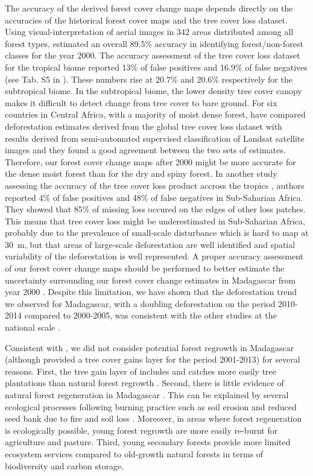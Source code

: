 \documentclass[a4paper, 12pt, leqno]{article}\usepackage[]{graphicx}\usepackage[]{color}
\begin{document}
The accuracy of the derived forest cover change maps depends directly
on the accuracies of the historical forest cover maps and the tree
cover loss dataset. Using visual-interpretation of aerial images in
342 areas distributed among all forest types, \citet{Harper2007}
estimated an overall 89.5\% accuracy in identifying forest/non-forest
classes for the year 2000. The accuracy assessment of the tree cover
loss dataset for the tropical biome reported 13\% of false positives
and 16.9\% of false negatives (see Tab. S5 in
\citet{Hansen2013}). These numbers rise at 20.7\% and 20.6\%
respectively for the subtropical biome. In the subtropical biome, the
lower density tree cover canopy makes it difficult to detect change
from tree cover to bare ground. For six countries in Central Africa,
with a majority of moist dense forest, \citet{Verhegghen2016} have
compared deforestation estimates derived from the global tree cover
loss dataset \citep{Hansen2013} with results derived from
semi-automated supervised classification of Landsat satellite images
\citep{Achard2014} and they found a good agreement between the two
sets of estimates. Therefore, our forest cover change maps after 2000
might be more accurate for the dense moist forest than for the dry and
spiny forest. In another study assessing the accuracy of the tree
cover loss product accross the tropics \citep{Tyukavina2015}, authors
reported 4\% of false positives and 48\% of false negatives in
Sub-Saharian Africa. They showed that 85\% of missing loss occured on
the edges of other loss patches. This means that tree cover loss might
be underestimated in Sub-Saharian Africa, probably due to the
prevalence of small-scale disturbance which is hard to map at 30~m,
but that areas of large-scale deforestation are well identified and
spatial variability of the deforestation is well represented. A proper
accuracy assessment of our forest cover change maps should be
performed to better estimate the uncertainty surrounding our
forest cover change estimates in Madagascar from year 2000
\citep{Olofsson2013,Olofsson2014}. Despite this limitation, we have
shown that the deforestation trend we observed for Madagascar, with a
doubling deforestation on the period 2010-2014 compared to 2000-2005,
was consistent with the other studies at the national scale
\citep{ONE2015, MEFT2009}.

Consistent with \citet{Harper2007}, we did not consider potential
forest regrowth in Madagascar (although \citet{Hansen2013} provided a
tree cover gains layer for the period 2001-2013) for several
reasons. First, the tree gain layer of \citet{Hansen2013} includes and
catches more easily tree plantations than natural forest regrowth
\citep{Tropek2014}. Second, there is little evidence of natural forest
regeneration in Madagascar \citep{Grouzis2001, Harper2007}. This can
be explained by several ecological processes following burning
practice such as soil erosion \citep{Grinand2017} and reduced seed
bank due to fire and soil loss \citep{Grouzis2001}. Moreover, in areas
where forest regeneration is ecologically possible, young forest
regrowth are more easily re-burnt for agriculture and pasture. Third,
young secondary forests provide more limited ecosystem services
compared to old-growth natural forests in terms of biodiversity and
carbon storage.
\end{document}
